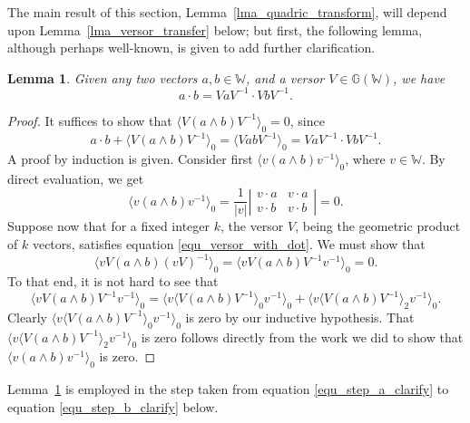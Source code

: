 \documentclass{birkjour}
\newtheorem{lem}[thm]{Lemma}
\theoremstyle{definition}
\theoremstyle{remark}
\numberwithin{equation}{section}
\newcommand{\G}{\mathbb{G}}
\newcommand{\W}{\mathbb{W}}
\begin{document}
The main result of this section, Lemma~\ref{lma_quadric_transform},
will depend upon Lemma~\ref{lma_versor_transfer} below;
but first, the following lemma, although perhaps well-known, is given to add further clarification.
\begin{lem}\label{lma_clarify}
Given any two vectors $a,b\in\W$, and a versor $V\in\G(\W)$, we have
\begin{equation}\label{equ_versor_with_dot}
a\cdot b=VaV^{-1}\cdot VbV^{-1}.
\end{equation}
\end{lem}
\begin{proof}
It suffices to show that $\langle V(a\wedge b)V^{-1}\rangle_0=0$, since
\begin{equation*}
a\cdot b + \langle V(a\wedge b)V^{-1}\rangle_0 = \langle VabV^{-1}\rangle_0 = VaV^{-1}\cdot VbV^{-1}.
\end{equation*}
A proof by induction is given.  Consider first $\langle v(a\wedge b)v^{-1}\rangle_0$, where $v\in\W$.
By direct evaluation, we get
\begin{equation*}
\langle v(a\wedge b)v^{-1}\rangle_0 = \frac{1}{|v|}
\left|\begin{array}{cc} v\cdot a & v\cdot a\\ v\cdot b & v\cdot b\end{array}\right| = 0.
\end{equation*}
Suppose now that for a fixed integer $k$, the versor $V$, being the geometric product of $k$ vectors,
satisfies equation \eqref{equ_versor_with_dot}.  We must show that
\begin{equation}
\langle vV(a\wedge b)(vV)^{-1}\rangle_0=\langle vV(a\wedge b)V^{-1}v^{-1}\rangle_0=0.
\end{equation}
To that end, it is not hard to see that
\begin{equation*}
\langle vV(a\wedge b)V^{-1}v^{-1}\rangle_0 =
\langle v\langle V(a\wedge b)V^{-1}\rangle_0 v^{-1}\rangle_0 +
\langle v\langle V(a\wedge b)V^{-1}\rangle_2 v^{-1}\rangle_0.
\end{equation*}
Clearly $\langle v\langle V(a\wedge b)V^{-1}\rangle_0 v^{-1}\rangle_0$ is zero by our inductive hypothesis.
That $\langle v\langle V(a\wedge b)V^{-1}\rangle_2 v^{-1}\rangle_0$ is zero follows directly from
the work we did to show that $\langle v(a\wedge b)v^{-1}\rangle_0$ is zero.
\end{proof}
Lemma~\ref{lma_clarify} is employed in the step taken from equation
\eqref{equ_step_a_clarify} to equation \eqref{equ_step_b_clarify} below.
\end{document}

